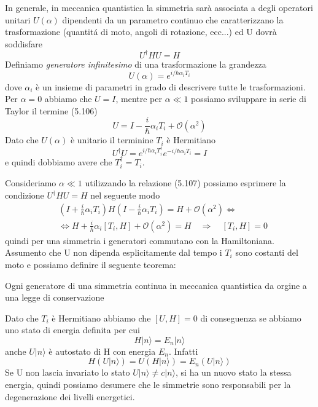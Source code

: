 In generale, in meccanica quantistica la simmetria sar\`a associata a degli operatori unitari $U(\alpha)$ dipendenti da un parametro continuo che caratterizzano la trasformazione (quantit\'a di moto, angoli di rotazione, ecc...) ed U dovr\`a soddisfare
\begin{equation*}
	U^\dag HU = H
\end{equation*}
Definiamo \textit{generatore infinitesimo} di una trasformazione la grandezza 
\begin{equation}
	U(\alpha) = e^{i/\hbar \alpha_i T_i}
\end{equation}
dove $\alpha_i$ \`e un insieme di parametri in grado di descrivere tutte le trasformazioni. Per $\alpha = 0$ abbiamo che $U=I$, mentre per $\alpha \ll 1$ possiamo sviluppare in serie di Taylor il termine (5.106)
\begin{equation}
	U = I - \frac{i}{\hbar}\alpha_i T_i + \mathcal{O}(\alpha^2)
\end{equation}
Dato che $U(\alpha)$ \`e unitario il terminine $T_i$ \`e Hermitiano
\begin{equation*}
	U^\dag U = e^{i/\hbar \alpha_i T_i^\dag}e^{-i/\hbar \alpha_iT_i} = I
\end{equation*}
\newpage
e quindi dobbiamo avere che $T_i^\dag = T_i$.

Consideriamo $\alpha \ll 1$ utilizzando la relazione (5.107) possiamo esprimere la condizione $U^\dag H U =H$ nel seguente modo
\begin{align*}
	& (I + \frac{i}{\hbar}\alpha_i T_i)H(I- \frac{i}{\hbar}\alpha_iT_i) = H + \mathcal{O}(\alpha^2) \iff \\[0.4cm] 
	& \iff H + \frac{i}{\hbar}\alpha_i[T_i,H] + \mathcal{O}(\alpha^2) = H \quad \Rightarrow \quad [T_i,H] =0
\end{align*}
quindi per una simmetria i generatori commutano con la Hamiltoniana. Assumento che U non dipenda esplicitamente dal tempo i $T_i$ sono costanti del moto e possiamo definire il seguente teorema:
\begin{theorem}
	Ogni generatore di una simmetria continua in meccanica quantistica da orgine a una legge di conservazione  
\end{theorem}

Dato che $T_i$ \`e Hermitiano abbiamo che $[U,H] =0$ di conseguenza se abbiamo uno stato di energia definita per cui
\begin{equation*}
	H |n \rangle = E_n |n \rangle
\end{equation*}
anche $U|n \rangle$ \`e autostato di H con energia $E_n$. Infatti
\begin{equation*}
	H(U|n \rangle) = U(H|n \rangle) = E_{n}(U|n \rangle)
\end{equation*}
Se U non lascia invariato lo stato $U|n \rangle \neq c |n \rangle $, si ha un nuovo stato la stessa energia, quindi possiamo desumere che le simmetrie sono responsabili per la degenerazione dei livelli energetici.


